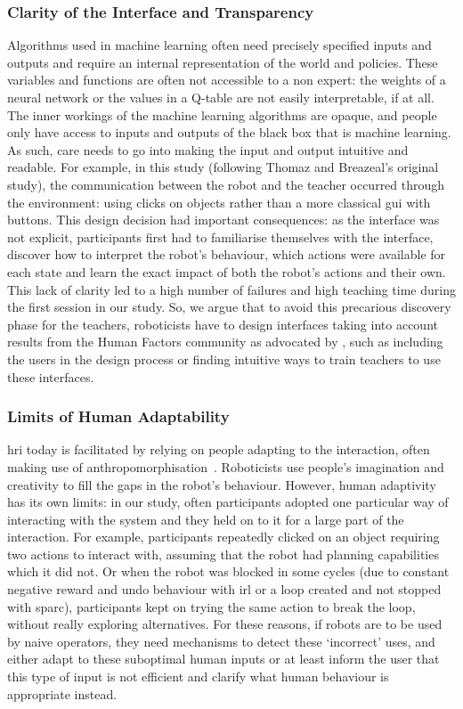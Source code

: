 \subsubsection{Clarity of the Interface and Transparency}

Algorithms used in machine learning often need precisely specified inputs and outputs and require an internal representation of the world and policies. These variables and functions are often not accessible to a non expert: the weights of a neural network or the values in a Q-table are not easily interpretable, if at all. The inner workings of the machine learning algorithms are opaque, and people only have access to inputs and outputs of the black box that is machine learning. As such, care needs to go into making the input and output intuitive and readable. For example, in this study (following Thomaz and Breazeal's original study), the communication between the robot and the teacher occurred through the environment: using clicks on objects rather than a more classical \gls{gui} with buttons. This design decision had important consequences: as the interface was not explicit, participants first had to familiarise themselves with the interface, discover how to interpret the robot's behaviour, which actions were available for each state and learn the exact impact of both the robot's actions and their own. This lack of clarity led to a high number of failures and high teaching time during the first session in our study. So, we argue that to avoid this precarious discovery phase for the teachers, roboticists have to design interfaces taking into account results from the Human Factors community as advocated by \cite{adams2002critical}, such as including the users in the design process or finding intuitive ways to train teachers to use these interfaces.

\subsubsection{Limits of Human Adaptability}

\gls{hri} today is facilitated by relying on people adapting to the interaction, often making use of anthropomorphisation~\citep{fong2003survey,zlotowski2015anthropomorphism}. Roboticists use people's imagination and creativity to fill the gaps in the robot's behaviour. However, human adaptivity has its own limits: in our study, often participants adopted one particular way of interacting with the system and they held on to it for a large part of the interaction. For example, participants repeatedly clicked on an object requiring two actions to interact with, assuming that the robot had planning capabilities which it did not. Or when the robot was blocked in some cycles (due to constant negative reward and undo behaviour with \gls{irl} or a loop created and not stopped with \gls{sparc}), participants kept on trying the same action to break the loop, without really exploring alternatives. For these reasons, if robots are to be used by naive operators, they need mechanisms to detect these `incorrect' uses, and either adapt to these suboptimal human inputs or at least inform the user that this type of input is not efficient and clarify what human behaviour is appropriate instead.

